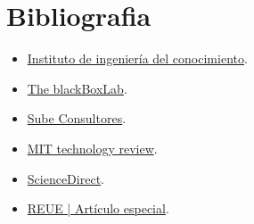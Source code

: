 \documentclass[12pt]{article}
\begin{document}
\section{Bibliografia}
\begin{itemize}
    \item \href{https://www.iic.uam.es/innovacion/alphazero-y-el-go/}{Instituto de ingeniería del conocimiento}.
    \item \href{https://theblackboxlab.com/2024/02/23/deepmind/}{The blackBoxLab}.
    \item \href{https://www.linkedin.com/pulse/creatividad-artificial-est%C3%A1-la-ia-redefiniendo-el-concepto-e0djc/}{Sube Consultores}.
    \item \href{https://www.technologyreview.es/s/16532/que-es-la-inteligencia-artificial}{MIT technology review}.
    \item \href{https://www.sciencedirect.com/science/article/pii/S1136103423000114}{ScienceDirect}.
    \item \href{chrome-extension://efaidnbmnnnibpcajpcglclefindmkaj/https://www.reue.org/wp-content/uploads/2024/07/184-195.pdf}{REUE | Artículo especial}.


\end{itemize}
\end{document}
